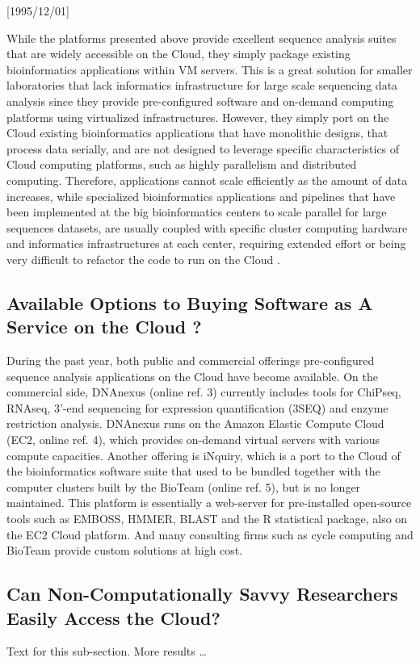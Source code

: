 \NeedsTeXFormat{LaTeX2e}[1995/12/01] \documentclass[10pt]{bmc_article}
\newenvironment{bmcformat}{\begin{raggedright}\baselineskip20pt\sloppy\setboolean{publ}{false}}{\end{raggedright}\baselineskip20pt\sloppy}
\begin{document}
\begin{bmcformat}
While the platforms presented above provide excellent sequence analysis suites that are widely accessible 
on the Cloud, they simply package existing bioinformatics applications within VM servers. This is a great 
solution for smaller laboratories that lack informatics infrastructure for large scale sequencing data analysis 
since they provide pre-configured software and on-demand computing platforms using virtualized infrastructures.  
However, they simply port on the Cloud existing bioinformatics applications that have monolithic designs, that
process data serially, and are not designed to leverage specific characteristics of Cloud computing platforms,
such as highly parallelism and distributed computing.  Therefore, applications cannot scale efficiently as the amount
of data increases, while specialized bioinformatics applications and pipelines that have been implemented at
the big bioinformatics centers to scale parallel for large sequences datasets, are usually coupled with specific 
cluster computing hardware and informatics infrastructures at each center, requiring extended effort or being 
very difficult to refactor the code to run on the Cloud \cite{Wilkening2009}.



\subsection*{Available Options to Buying Software as A Service on the Cloud ?}

During the past year, both public and commercial offerings pre-configured sequence analysis applications on
the Cloud have become available. On the commercial side, DNAnexus (online ref.  3) currently includes tools
for ChiPseq, RNAseq, 3'-end sequencing for expression quantification (3SEQ) and enzyme restriction analysis.
DNAnexus runs on the Amazon Elastic Compute Cloud (EC2, online ref. 4), which provides on-demand virtual
servers with various compute capacities. Another offering is iNquiry, which is a port to the Cloud of the
bioinformatics software suite that used to be bundled together with the computer clusters built by the BioTeam
(online ref. 5), but is no longer maintained. This platform is essentially a web-server for pre-installed
open-source tools such as EMBOSS, HMMER, BLAST and the R statistical package, also on the EC2 Cloud platform.
And many consulting firms such as cycle computing and BioTeam provide custom solutions at high cost.


\subsection*{Can Non-Computationally Savvy Researchers Easily Access the Cloud?} Text for this sub-section.
More results \ldots


\end{bmcformat}
\end{document}
